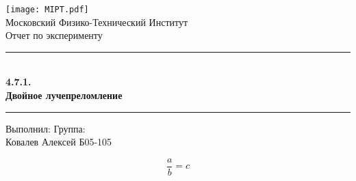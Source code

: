 \documentclass[a4paper,12pt]{article}
\begin{document}
\begin{titlepage}
        \vspace*{\fill}

        \begin{center}
            \texttt{[image: MIPT.pdf]}
            \\[0.7cm]\Huge Московский Физико-Технический Институт
            \\[2cm]\LARGE Отчет по эксперименту
            \\[0.5cm]\noindent\rule{\textwidth}{1pt}
            \\\Huge\textbf{4.7.1. \\ Двойное лучепреломление}
            \\[-0.5cm]\noindent\rule{\textwidth}{1pt}
        \end{center}

        \vspace*{\fill}

        \begin{flushleft}
            Выполнил: \hspace{\fill} Группа:
            \\Ковалев Алексей \hspace{\fill} Б05-105
        \end{flushleft}
    \end{titlepage}

    \setcounter{page}{2}

    \[
        \frac{a}{b} = c
    \]
\end{document}
